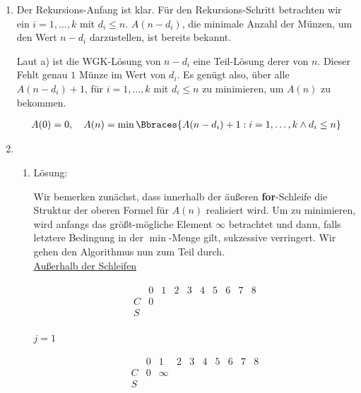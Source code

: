 \begin{solution}
\begin{enumerate}[label = \alph*]
\begin{enumerate}[label = \arabic*.]
  \end{enumerate}

  \item Der Rekursions-Anfang ist klar.
  Für den Rekursions-Schritt betrachten wir ein $i = 1, \dots, k$ mit $d_i \leq n$.
  $A(n - d_i)$, die minimale Anzahl der Münzen, um den Wert $n - d_i$ darzustellen, ist bereits bekannt.

  Laut a) ist die WGK-Lösung von $n - d_i$ eine Teil-Lösung derer von $n$.
  Dieser Fehlt genau $1$ Münze im Wert von $d_i$.
  Es genügt also, über alle $A(n - d_i) + 1$, für $i = 1, \dots, k$ mit $d_i \leq n$ zu minimieren, um $A(n)$ zu bekommen.

  \begin{align*}
    A(0) = 0,
    \quad
    A(n) = \min \Bbraces{A(n - d_i) + 1: i = 1, \dots, k \land d_i \leq n}
  \end{align*}

  \item \phantom{}

  \begin{enumerate}[label = \arabic*.]

    \item Lösung:

    Wir bemerken zunächst, dass innerhalb der äußeren \textbf{for}-Schleife die Struktur der oberen Formel für $A(n)$ realisiert wird.
    Um zu minimieren, wird anfangs das größt-mögliche Element $\infty$ betrachtet und dann, falls letztere Bedingung in der $\min$-Menge gilt, sukzessive verringert.
    Wir gehen den Algorithmus nun zum Teil durch. \\

    \underline{Außerhalb der Schleifen}

    \begin{align*}
      \begin{array}{c|c|c|c|c|c|c|c|c|c}
          & 0 & 1 & 2 & 3 & 4 & 5 & 6 & 7 & 8 \\ \hline
        C & 0 &   &   &   &   &   &   &   &   \\ \hline
        S &   &   &   &   &   &   &   &   &   \\
      \end{array}
    \end{align*}

    \underline{$j = 1$}

    \begin{align*}
      \begin{array}{c|c|c|c|c|c|c|c|c|c}
          & 0 & 1      & 2 & 3 & 4 & 5 & 6 & 7 & 8 \\ \hline
        C & 0 & \infty &   &   &   &   &   &   &   \\ \hline
        S &   &        &   &   &   &   &   &   &   \\
      \end{array}
    \end{align*}


\end{enumerate}
\end{enumerate}
\end{solution}
